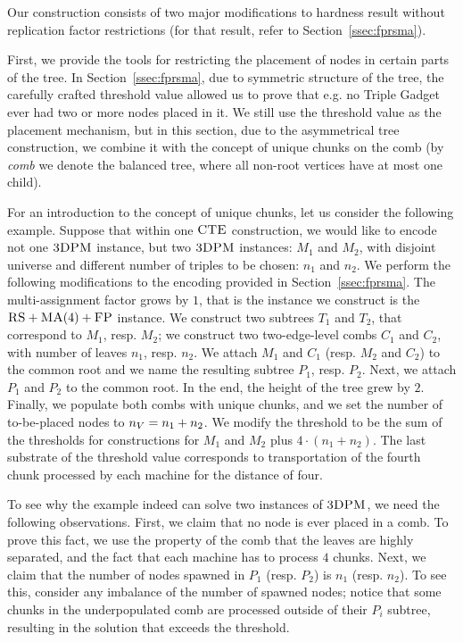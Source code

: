 Our construction consists of two major modifications to hardness result without replication factor restrictions (for that result, refer to Section~\ref{ssec:fprsma}).

 First, we provide the tools for restricting the placement of nodes in certain parts of the tree.
In Section~\ref{ssec:fprsma}, due to symmetric structure of the tree, the carefully crafted threshold value allowed us to prove that e.g. no Triple Gadget ever had two or more nodes placed in it.
We still use the threshold value as the placement mechanism, but in this section, due to the asymmetrical tree construction, we combine it with the concept of unique chunks on the comb (by \emph{comb} we denote the balanced tree, where all non-root vertices have at most one child).

For an introduction to the concept of unique chunks, let us consider the following example.
Suppose that within one $\textsc{CTE}$ construction, we would like to encode not one $\textsc{3DPM}$ instance, but two $\textsc{3DPM}$ instances: $M_1$ and $M_2$, with disjoint universe and different number of triples to be chosen: $n_1$ and $n_2$.
We perform the following modifications to the encoding provided in Section~\ref{ssec:fprsma}.
The multi-assignment factor grows by $1$, that is the instance we construct is the $\textsc{RS}+\textsc{MA}(4)+\textsc{FP}$ instance.
We construct two subtrees $T_1$ and $T_2$, that correspond to $M_1$, resp. $M_2$; we construct two two-edge-level combs $C_1$ and $C_2$, with number of leaves $n_1$, resp. $n_2$.
We attach $M_1$ and $C_1$ (resp. $M_2$ and $C_2$) to the common root and we name the resulting subtree $P_1$, resp. $P_2$.
Next, we attach $P_1$ and $P_2$ to the common root.
In the end, the height of the tree grew by $2$.
Finally, we populate both combs with unique chunks, and we set the number of to-be-placed nodes to $n_V = n_1+n_2$.
We modify the threshold to be the sum of the thresholds for constructions for $M_1$ and $M_2$ plus $4\cdot (n_1 + n_2)$.
The last substrate of the threshold value corresponds to transportation of the fourth chunk processed by each machine for the distance of four.

To see why the example indeed can solve two instances of $\textsc{3DPM}$, we need the following observations.
First, we claim that no node is ever placed in a comb.
To prove this fact, we use the property of the comb that the leaves are highly separated, and the fact that each machine has to process $4$ chunks.
Next, we claim that the number of nodes spawned in $P_1$ (resp. $P_2$) is $n_1$ (resp. $n_2$).
To see this, consider any imbalance of the number of spawned nodes; notice that some chunks in the underpopulated comb are processed outside of their $P_i$ subtree, resulting in the solution that exceeds the threshold.

